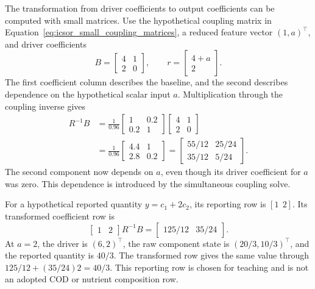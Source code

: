 The transformation from driver coefficients to output coefficients can be computed with small matrices. Use the hypothetical coupling matrix in Equation~\eqref{eq:icsor_small_coupling_matrices}, a reduced feature vector \((1,a)^\top\), and driver coefficients
\begin{equation}
\label{eq:icsor_small_driver_coefficient_matrix}
B=\begin{bmatrix}4&1\\2&0\end{bmatrix},
\qquad
r=\begin{bmatrix}4+a\\2\end{bmatrix}.
\end{equation}
The first coefficient column describes the baseline, and the second describes dependence on the hypothetical scalar input \(a\). Multiplication through the coupling inverse gives
\begin{equation}
\label{eq:icsor_small_back_projection}
\begin{aligned}
R^{-1}B
&=\frac{1}{0.96}
\begin{bmatrix}1&0.2\\0.2&1\end{bmatrix}
\begin{bmatrix}4&1\\2&0\end{bmatrix}\\
&=\frac{1}{0.96}\begin{bmatrix}4.4&1\\2.8&0.2\end{bmatrix}
=\begin{bmatrix}55/12&25/24\\35/12&5/24\end{bmatrix}.
\end{aligned}
\end{equation}
The second component now depends on \(a\), even though its driver coefficient for \(a\) was zero. This dependence is introduced by the simultaneous coupling solve.

For a hypothetical reported quantity \(y=c_1+2c_2\), its reporting row is \([1\ \ 2]\). Its transformed coefficient row is
\begin{equation}
\label{eq:icsor_small_composite_projection}
\begin{bmatrix}1&2\end{bmatrix}R^{-1}B
=\begin{bmatrix}125/12&35/24\end{bmatrix}.
\end{equation}
At \(a=2\), the driver is \((6,2)^\top\), the raw component state is \((20/3,10/3)^\top\), and the reported quantity is \(40/3\). The transformed row gives the same value through \(125/12+(35/24)2=40/3\). This reporting row is chosen for teaching and is not an adopted COD or nutrient composition row.

